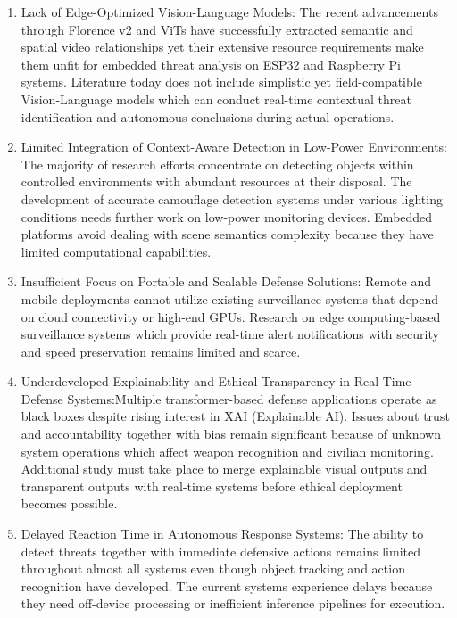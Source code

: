 \documentclass[fleqn,10pt,lineno]{wlpeerj}
\begin{document}
\begin{enumerate}
    \item Lack of Edge-Optimized Vision-Language Models: The recent advancements through Florence v2 and ViTs have successfully extracted semantic and spatial video relationships yet their extensive resource requirements make them unfit for embedded threat analysis on ESP32 and Raspberry Pi systems. Literature today does not include simplistic yet field-compatible Vision-Language models which can conduct real-time contextual threat identification and autonomous conclusions during actual operations.
    \item Limited Integration of Context-Aware Detection in Low-Power Environments: The majority of research efforts concentrate on detecting objects within controlled environments with abundant resources at their disposal. The development of accurate camouflage detection systems under various lighting conditions needs further work on low-power monitoring devices. Embedded platforms avoid dealing with scene semantics complexity because they have limited computational capabilities.
    \item Insufficient Focus on Portable and Scalable Defense Solutions: Remote and mobile deployments cannot utilize existing surveillance systems that depend on cloud connectivity or high-end GPUs. Research on edge computing-based surveillance systems which provide real-time alert notifications with security and speed preservation remains limited and scarce.
    \item Underdeveloped Explainability and Ethical Transparency in Real-Time Defense Systems:Multiple transformer-based defense applications operate as black boxes despite rising interest in XAI (Explainable AI). Issues about trust and accountability together with bias remain significant because of unknown system operations which affect weapon recognition and civilian monitoring. Additional study must take place to merge explainable visual outputs and transparent outputs with real-time systems before ethical deployment becomes possible.
    \item Delayed Reaction Time in Autonomous Response Systems: The ability to detect threats together with immediate defensive actions remains limited throughout almost all systems even though object tracking and action recognition have developed. The current systems experience delays because they need off-device processing or inefficient inference pipelines for execution.
\end{enumerate}
\end{document}
